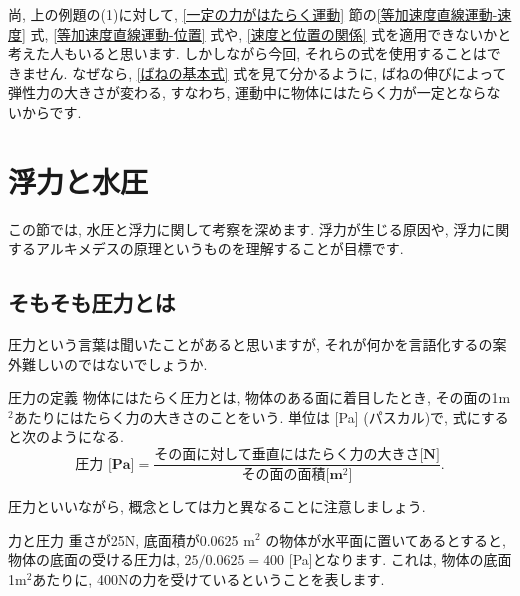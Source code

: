 \documentclass[11pt,dvipdfmx]{jsarticle}
\numberwithin{equation}{section} %
\begin{document}
尚, 上の例題の(1)に対して, \ref{一定の力がはたらく運動} 節の\eqref{等加速度直線運動-速度} 式, \eqref{等加速度直線運動-位置} 式や, \eqref{速度と位置の関係} 式を適用できないかと考えた人もいると思います. しかしながら今回, それらの式を使用することはできません. なぜなら, \eqref{ばねの基本式} 式を見て分かるように, ばねの伸びによって弾性力の大きさが変わる, すなわち, 運動中に物体にはたらく力が一定とならないからです. 

\section{浮力と水圧}
この節では, 水圧と浮力に関して考察を深めます. 浮力が生じる原因や, 浮力に関するアルキメデスの原理というものを理解することが目標です. 
\subsection{そもそも圧力とは}
圧力という言葉は聞いたことがあると思いますが, それが何かを言語化するの案外難しいのではないでしょうか. 
\begin{freebox}{圧力の定義}
    物体にはたらく圧力とは, 物体のある面に着目したとき, その面の1m$^2$あたりにはたらく力の大きさのことをいう. 単位は [Pa] (パスカル)で, 式にすると次のようになる.
    \begin{equation}
        \textbf{圧力 [Pa]} = \frac{\textbf{その面に対して垂直にはたらく力の大きさ[N]}}{\textbf{その面の面積[m$^2$]}}. \label{圧力の定義式}
    \end{equation}
\end{freebox}
圧力といいながら, 概念としては力と異なることに注意しましょう. 
\begin{exbox}{力と圧力}
    重さが25N, 底面積が0.0625 m$^2$ の物体が水平面に置いてあるとすると, 物体の底面の受ける圧力は, $25/0.0625 = 400$ [Pa]となります. これは, 物体の底面1m$^2$あたりに, 400Nの力を受けているということを表します. 
\end{exbox} 
\end{document}
